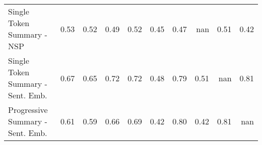 \begin{tabular}{lrrrrrrrrr}
Single Token Summary - NSP & \cellcolor[RGB]{127,162,250}0.53 & \cellcolor[RGB]{120,155,247}0.52 & \cellcolor[RGB]{103,136,237}0.49 & \cellcolor[RGB]{122,157,248}0.52 & \cellcolor[RGB]{75,100,212}0.45 & \cellcolor[RGB]{91,121,228}0.47 & \cellcolor[RGB]{0,0,0}nan & \cellcolor[RGB]{116,151,245}0.51 & \cellcolor[RGB]{58,76,192}0.42 \\
Single Token Summary - Sent. Emb. & \cellcolor[RGB]{215,219,226}0.67 & \cellcolor[RGB]{205,217,236}0.65 & \cellcolor[RGB]{237,207,192}0.72 & \cellcolor[RGB]{238,207,190}0.72 & \cellcolor[RGB]{96,128,232}0.48 & \cellcolor[RGB]{246,166,135}0.79 & \cellcolor[RGB]{116,151,245}0.51 & \cellcolor[RGB]{0,0,0}nan & \cellcolor[RGB]{244,154,123}0.81 \\
Progressive Summary - Sent. Emb. & \cellcolor[RGB]{183,207,249}0.61 & \cellcolor[RGB]{172,200,252}0.59 & \cellcolor[RGB]{214,219,228}0.66 & \cellcolor[RGB]{226,217,212}0.69 & \cellcolor[RGB]{62,81,196}0.42 & \cellcolor[RGB]{244,157,126}0.80 & \cellcolor[RGB]{58,76,192}0.42 & \cellcolor[RGB]{244,154,123}0.81 & \cellcolor[RGB]{0,0,0}nan \\
\bottomrule
\end{tabular}
